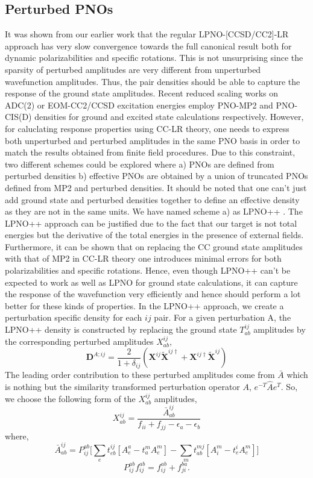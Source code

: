 \subsection{Perturbed PNOs}
It was shown from our earlier work that the regular LPNO-[CCSD/CC2]-LR approach has
very slow convergence towards the full canonical result both for dynamic polarizabilities
and specific rotations\cite{}. This is not unsurprising since the sparsity of perturbed 
amplitudes are very different from unperturbed wavefunction amplitudes. Thus, the 
pair densities should be able to capture the response of the ground state amplitudes. 
Recent reduced scaling works on ADC(2) or EOM-CC2/CCSD excitation energies employ 
PNO-MP2 and PNO-CIS(D) densities for ground and excited state calculations respectively.\cite{}
However, for caluclating response properties using CC-LR theory, one needs to express both 
unperturbed and perturbed amplitudes in the same PNO basis in order to match the results
obtained from finite field procedures. Due to this constraint, two different 
schemes could be explored where a) PNOs are defined from perturbed densities b) effective PNOs 
are obtained by a union of truncated PNOs defined from MP2 and perturbed densities. It should
be noted that one can't just add ground state and perturbed densities together to define an effective
density as they are not in the same units. We have named scheme a) as LPNO++ .
The LPNO++ approach can be justified due to the fact that our target is not total energies but the 
derivative of the total energies in the presence of external fields. Furthermore, it can
be shown that on replacing the CC ground state amplitudes with that of MP2 in CC-LR theory
one introduces minimal errors for both polarizabilities and specific rotations.\cite{} 
Hence, even though LPNO++ can't be expected to work as well as LPNO for ground state 
calculations, it can capture the response of the wavefunction very efficiently and 
hence should perform a lot better for these kinds of properties. In the LPNO++ approach, 
we create a perturbation specific density for each $ij$ pair. For a given perturbation A, 
the LPNO++ density is constructed by replacing the ground state $T^{ij}_{ab}$ amplitudes 
by the corresponding perturbed amplitudes $X^{ij}_{ab}$, 
\begin{equation}
\bm{D}^{A;ij} = \frac{2}{1+\delta_{ij}} (\bm{X}^{ij}\bm{\tilde{X}}^{ij\dagger} + \bm{X}^{ij\dagger}\bm{\tilde{X}}^{ij})
\end{equation}
The leading order contribution to these perturbed amplitudes come from $\bar{A}$ which is nothing but 
the similarity transformed perturbation operator $A$, $e^{-T}\hat{A}e^{T}$. So, we choose the following
form of the $X^{ij}_{ab}$ amplitudes,
\begin{equation}
X^{ij}_{ab} =  \frac{\bar{A}^{ij}_{ab}}{f_{ii} + f_{jj} - \epsilon_a - \epsilon_b} 
\end{equation} 
where,
\begin{equation}
\bar{A}^{ij}_{ab} = P_{ij}^{ab}\bigg[\sum_e t^{ij}_{eb}[A^a_e - t^m_a A^m_e] -\sum_m t^{mj}_{ab}[A^m_i - t^i_e A^m_e]\bigg]
\end{equation} 
\begin{equation}
P_{ij}^{ab} f_{ij}^{ab} = f_{ij}^{ab} + f_{ji}^{ba} .
\end{equation}
